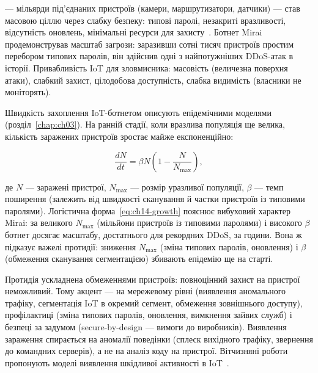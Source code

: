  --- мільярди під'єднаних пристроїв (камери, маршрутизатори, датчики) --- став масовою ціллю через слабку безпеку: типові паролі, незакриті вразливості, відсутність оновлень, мінімальні ресурси для захисту~\cite{ch14:iot-owasp}. Ботнет Mirai~\cite{ch14:antonakakis} продемонстрував масштаб загрози: заразивши сотні тисяч пристроїв простим перебором типових паролів, він здійснив одні з найпотужніших DDoS-атак в історії. Привабливість IoT для зловмисника: масовість (величезна поверхня атаки), слабкий захист, цілодобова доступність, слабка видимість (власники не моніторять).

Швидкість захоплення IoT-ботнетом описують епідемічними моделями (розділ~\ref{chap:ch03}). На ранній стадії, коли вразлива популяція ще велика, кількість заражених пристроїв зростає майже експоненційно:

\begin{equation}
\frac{dN}{dt} = \beta N\left(1 - \frac{N}{N_{\max}}\right),
\label{eq:ch14-growth}
\end{equation}

де $N$ --- заражені пристрої, $N_{\max}$ --- розмір уразливої популяції, $\beta$ --- темп поширення (залежить від швидкості сканування й частки пристроїв із типовими паролями). Логістична форма~\eqref{eq:ch14-growth} пояснює вибуховий характер Mirai: за великого $N_{\max}$ (мільйони пристроїв із типовими паролями) і високого $\beta$ ботнет досягає масштабу, достатнього для рекордних DDoS, за години. Вона ж підказує важелі протидії: зниження $N_{\max}$ (зміна типових паролів, оновлення) і $\beta$ (обмеження сканування сегментацією) збивають епідемію ще на старті.

\begin{tikzfig}
\end{tikzfig}

Протидія ускладнена обмеженнями пристроїв: повноцінний захист на пристрої неможливий. Тому акцент --- на мережевому рівні (виявлення аномального трафіку, сегментація IoT в окремий сегмент, обмеження зовнішнього доступу), профілактиці (зміна типових паролів, оновлення, вимкнення зайвих служб) і безпеці за задумом (secure-by-design --- вимоги до виробників). Виявлення зараження спирається на аномалії поведінки (сплеск вихідного трафіку, звернення до командних серверів), а не на аналіз коду на пристрої. Вітчизняні роботи пропонують моделі виявлення шкідливої активності в IoT~\cite{ch14:iot-ua}.

